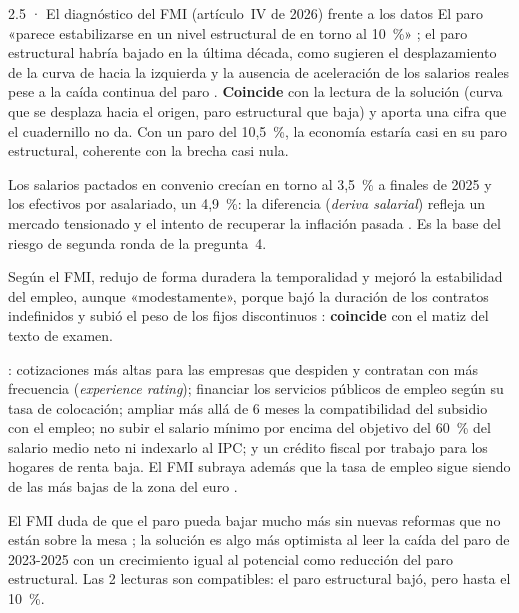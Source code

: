 \begin{complemento}{2.5 · El diagnóstico del FMI (artículo~IV de 2026) frente a los datos}
 El paro «parece estabilizarse en un nivel estructural de en torno al 10~\%» ; el paro estructural habría bajado en la última década, como sugieren el desplazamiento de la curva de  hacia la izquierda y la ausencia de aceleración de los salarios reales pese a la caída continua del paro . \textbf{Coincide} con la lectura de la solución (curva que se desplaza hacia el origen, paro estructural que baja) y aporta una cifra que el cuadernillo no da. Con un paro del 10,5~\%, la economía estaría casi en su paro estructural, coherente con la brecha casi nula.

 Los salarios pactados en convenio crecían en torno al 3,5~\% a finales de 2025 y los efectivos por asalariado, un 4,9~\%: la diferencia (\emph{deriva salarial}) refleja un mercado tensionado y el intento de recuperar la inflación pasada . Es la base del riesgo de segunda ronda de la pregunta~4.

 Según el FMI, redujo de forma duradera la temporalidad y mejoró la estabilidad del empleo, aunque «modestamente», porque bajó la duración de los contratos indefinidos y subió el peso de los fijos discontinuos : \textbf{coincide} con el matiz del texto de examen.

 : cotizaciones más altas para las empresas que despiden y contratan con más frecuencia (\emph{experience rating}); financiar los servicios públicos de empleo según su tasa de colocación; ampliar más allá de 6 meses la compatibilidad del subsidio con el empleo; no subir el salario mínimo por encima del objetivo del 60~\% del salario medio neto ni indexarlo al IPC; y un crédito fiscal por trabajo para los hogares de renta baja. El FMI subraya además que la tasa de empleo sigue siendo de las más bajas de la zona del euro .

 El FMI duda de que el paro pueda bajar mucho más sin nuevas reformas que no están sobre la mesa ; la solución es algo más optimista al leer la caída del paro de 2023-2025 con un crecimiento igual al potencial como reducción del paro estructural. Las 2 lecturas son compatibles: el paro estructural bajó, pero hasta el 10~\%.
\end{complemento}

